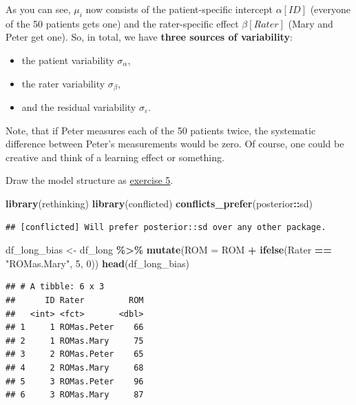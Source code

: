 \documentclass[
]{book}
\newenvironment{Shaded}{\begin{snugshade}}{\end{snugshade}}
\newcommand{\AttributeTok}[1]{\textcolor[rgb]{0.13,0.29,0.53}{#1}}
\newcommand{\DecValTok}[1]{\textcolor[rgb]{0.00,0.00,0.81}{#1}}
\newcommand{\FunctionTok}[1]{\textcolor[rgb]{0.13,0.29,0.53}{\textbf{#1}}}
\newcommand{\NormalTok}[1]{#1}
\newcommand{\OtherTok}[1]{\textcolor[rgb]{0.56,0.35,0.01}{#1}}
\newcommand{\SpecialCharTok}[1]{\textcolor[rgb]{0.81,0.36,0.00}{\textbf{#1}}}
\newcommand{\StringTok}[1]{\textcolor[rgb]{0.31,0.60,0.02}{#1}}
\providecommand{\tightlist}{%
  \setlength{\itemsep}{0pt}\setlength{\parskip}{0pt}}
\begin{document}
As you can see, \(\mu_i\) now consists of the patient-specific intercept \(\alpha[ID]\)
(everyone of the 50 patients gets one)
and the rater-specific effect \(\beta[Rater]\) (Mary and Peter get one).
So, in total, we have \textbf{three sources of variability}:

\begin{itemize}
\tightlist
\item
  the patient variability \(\sigma_{\alpha}\),
\item
  the rater variability \(\sigma_{\beta}\),
\item
  and the residual variability \(\sigma_{\varepsilon}\).
\end{itemize}

Note, that if Peter measures each of the 50 patients twice,
the systematic difference between Peter's measurements would
be zero. Of course, one could be creative and think of
a learning effect or something.

Draw the model structure as \hyperref[exercise5]{exercise 5}.

\begin{Shaded}
\begin{Highlighting}[]
\FunctionTok{library}\NormalTok{(rethinking)}
\FunctionTok{library}\NormalTok{(conflicted)}
\FunctionTok{conflicts\_prefer}\NormalTok{(posterior}\SpecialCharTok{::}\NormalTok{sd)}
\end{Highlighting}
\end{Shaded}

\begin{verbatim}
## [conflicted] Will prefer posterior::sd over any other package.
\end{verbatim}

\begin{Shaded}
\begin{Highlighting}[]
\NormalTok{df\_long\_bias }\OtherTok{\textless{}{-}}\NormalTok{ df\_long }\SpecialCharTok{\%\textgreater{}\%}
  \FunctionTok{mutate}\NormalTok{(}\AttributeTok{ROM =}\NormalTok{ ROM }\SpecialCharTok{+} \FunctionTok{ifelse}\NormalTok{(Rater }\SpecialCharTok{==} \StringTok{"ROMas.Mary"}\NormalTok{, }\DecValTok{5}\NormalTok{, }\DecValTok{0}\NormalTok{))}
\FunctionTok{head}\NormalTok{(df\_long\_bias)}
\end{Highlighting}
\end{Shaded}

\begin{verbatim}
## # A tibble: 6 x 3
##      ID Rater         ROM
##   <int> <fct>       <dbl>
## 1     1 ROMas.Peter    66
## 2     1 ROMas.Mary     75
## 3     2 ROMas.Peter    65
## 4     2 ROMas.Mary     68
## 5     3 ROMas.Peter    96
## 6     3 ROMas.Mary     87
\end{verbatim}
\end{document}
